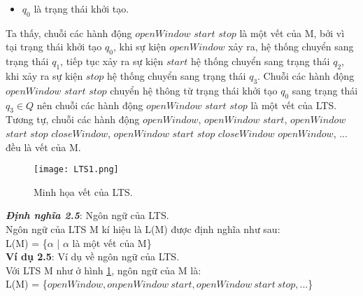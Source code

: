 \documentclass[a4paper,13pt,oneside,openany]{book}
\begin{document}
\begin{flushleft}
\begin{itemize}
			\item $q_0$ là trạng thái khởi tạo.
		\end{itemize}
		Ta thấy, chuỗi các hành động $openWindow$ $start$ $stop$ là một vết của M, bởi vì tại trạng thái khởi tạo $q_0$, khi sự kiện $openWindow$ xảy ra, hệ thống chuyển sang trạng thái $q_1$, tiếp tục xảy ra sự kiện $start$ hệ thống chuyển sang trạng thái $q_2$, khi xảy ra sự kiện $stop$ hệ thống chuyển sang trạng thái $q_3$. Chuỗi các hành động $openWindow$ $start$ $stop$ chuyển hệ thông từ trạng thái khởi tạo $q_0$ sang trạng thái $q_3 \in Q$ nên chuỗi các hành động  $openWindow$ $start$ $stop$ là một vết của LTS. Tương tự, chuỗi các hành động $openWindow$, $openWindow$ $start$, $openWindow$ $start$ $stop$ $closeWindow$, $openWindow$ $start$ $stop$ $closeWindow$ $openWindow$, ... đều là vết của M.\\

		\begin{figure}[h]
			\centering
			\texttt{[image: LTS1.png]}
			\caption{Minh họa vết của LTS.}
			\label{fig:LTS2}
		\end{figure}
		
		\noindent
		\textbf{\textit{Định nghĩa 2.5}}: Ngôn ngữ của LTS.\\
		Ngôn ngữ của LTS M kí hiệu là L(M) được định nghĩa như sau:\\
		L(M) = \{$\alpha$ | $\alpha$ là một vết của M\}\\
		\textbf{Ví dụ 2.5}: Ví dụ về ngôn ngữ của LTS.\\
		Với LTS M như ở hình \ref{fig:LTS2}, ngôn ngữ của M là:\\
		L(M) = \{$openWindow, onpenWindow\ start, openWindow \ start \ stop, ...$\}

\end{flushleft}
\end{document}
